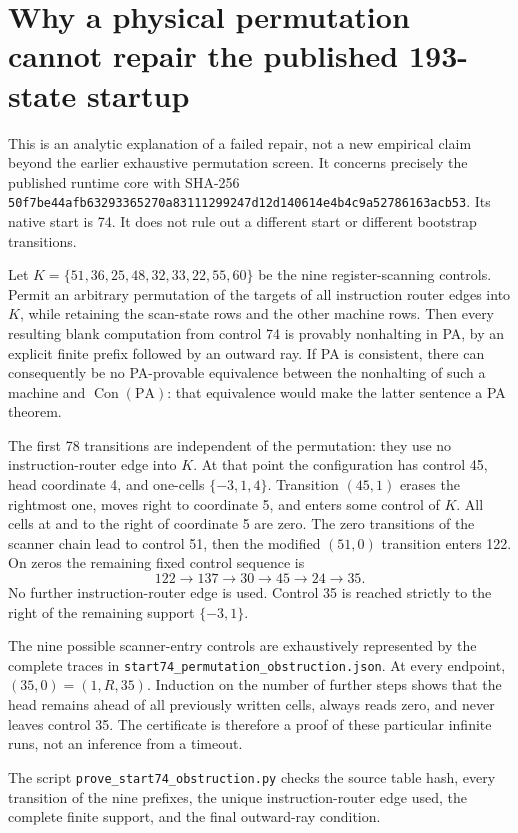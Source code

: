 \section{Why a physical permutation cannot repair the published 193-state startup}

This is an analytic explanation of a failed repair, not a new empirical
claim beyond the earlier exhaustive permutation screen. It concerns precisely the published runtime core with SHA-256
\texttt{50f7be44afb63293365270a83111299247d12d140614e4b4c9a52786163acb53}.
Its native start is 74. It does not rule out a different start or different
bootstrap transitions.

Let $K=\{51,36,25,48,32,33,22,55,60\}$ be the nine register-scanning
controls. Permit an arbitrary permutation of the targets of all instruction
router edges into $K$, while retaining the scan-state rows and the other
machine rows. Then every resulting blank computation from control 74 is
provably nonhalting in PA, by an explicit finite prefix followed by an
outward ray. If PA is consistent, there can consequently be no PA-provable equivalence
between the nonhalting of such a machine and $\operatorname{Con}(\mathrm{PA})$: that equivalence would make the latter sentence a PA theorem.

The first 78 transitions are independent of the permutation: they use no
instruction-router edge into $K$. At that point the configuration has
control 45, head coordinate 4, and one-cells $\{-3,1,4\}$. Transition
$(45,1)$ erases the rightmost one, moves right to coordinate 5, and enters
some control of $K$. All cells at and to the right of coordinate 5 are zero.
The zero transitions of the scanner chain lead to control 51, then the
modified $(51,0)$ transition enters 122. On zeros the remaining fixed
control sequence is
\[
122\longrightarrow137\longrightarrow30\longrightarrow45
\longrightarrow24\longrightarrow35.
\]
No further instruction-router edge is used. Control 35 is reached strictly
to the right of the remaining support $\{-3,1\}$.

The nine possible scanner-entry controls are exhaustively represented by
the complete traces in \texttt{start74\_permutation\_obstruction.json}.
At every endpoint, $(35,0)=(1,R,35)$. Induction on the number of further
steps shows that the head remains ahead of all previously written cells,
always reads zero, and never leaves control 35. The certificate is therefore
a proof of these particular infinite runs, not an inference from a timeout.

The script \texttt{prove\_start74\_obstruction.py} checks the source table
hash, every transition of the nine prefixes, the unique instruction-router
edge used, the complete finite support, and the final outward-ray condition.
